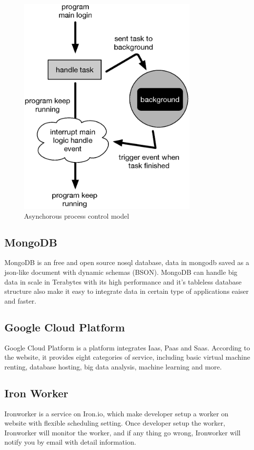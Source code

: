 \begin{figure}[H]
    \centering
    \includegraphics[width = 0.8\textwidth]{fig/asynchonous-process.eps}
    \caption{Asynchorous process control model}
    \label{fig:asynchornous}
\end{figure}


\subsection{MongoDB}
MongoDB \cite{mongodb} is an free and open source nosql database, data in mongodb saved as a json-like document with dynamic schemas (BSON).
MongoDB can handle big data in scale in Terabytes with its high performance and it's tableless database structure also make it easy to integrate data in certain type of applications eaiser and faster.

\subsection{Google Cloud Platform}
Google Cloud Platform \cite{googlecloud} is a platform integrates Iaas, Paas and Saas.
According to the website, it provides eight categories of service, including basic virtual machine renting, database hosting, big data analysis, machine learning and more.

\subsection{Iron Worker}
Ironworker \cite{ironworker} is a service on Iron.io, which make developer setup a worker on website with flexible scheduling setting.
Once developer setup the worker, Ironworker will monitor the worker, and if any thing go wrong, Ironworker will notify you by email with detail information.

